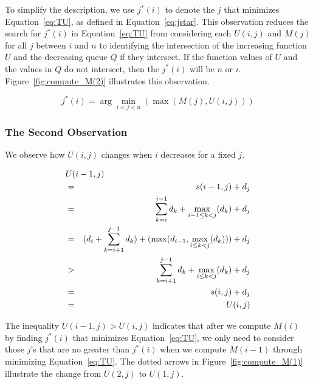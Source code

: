 To simplify the description, we use $j^*(i)$ to denote the $j$ that minimizes Equation~\ref{eq:TU}, as defined in Equation~\ref{eq:jstar}.
This observation reduces the search for $j^*(i)$ in Equation~\ref{eq:TU} from considering each $U(i, j)$ and $M(j)$ for all $j$ between $i$ and $n$ to identifying the intersection of the increasing function $U$ and the decreasing queue $Q$ if they intersect.
If the function values of $U$ and the values in $Q$ do not intersect, then the $j^*(i)$ will be $n$ or $i$.
Figure~\ref{fig:compute_M(2)} illustrates this observation.

\begin{equation}
j^*(i) = \arg \min_{i < j < n}(\max(M(j), U(i, j))) \label{eq:jstar}
\end{equation}

\subsubsection{The Second Observation}
We observe how $U(i, j)$ changes when $i$ decreases for a fixed $j$.

\begin{eqnarray}
\lefteqn{U(i - 1, j)}  \label{eq:Ui1} \\
& = &  s(i - 1,j) + d_j \nonumber \\ 
& = & \sum_{k = i}^{j-1} d_k + \max_{i-1 \leq k < j}(d_k) + d_j \label{eq:U-update}\\
& = & (d_i + \sum_{k = i+1}^{j-1} d_k) + (\max(d_{i-1}, \max_{i \leq k < j}(d_k))) + d_j \nonumber\\
& > & \sum_{k = i+1}^{j-1} d_k + \max_{i \leq k < j}(d_k) + d_j \\
& = & s(i,j) + d_j \\
& = & U(i,j)
\end{eqnarray}

The inequality $U(i - 1, j) > U(i, j)$ indicates that after we compute $M(i)$ by finding $j^*(i)$ that minimizes Equation~\ref{eq:TU}, we only need to consider those $j$'s that are no greater than $j^*(i)$ when we compute $M(i - 1)$ through minimizing Equation~\ref{eq:TU}.
The dotted arrows in Figure~\ref{fig:compute_M(1)} illustrate the change from $U(2, j)$ to $U(1, j)$.

